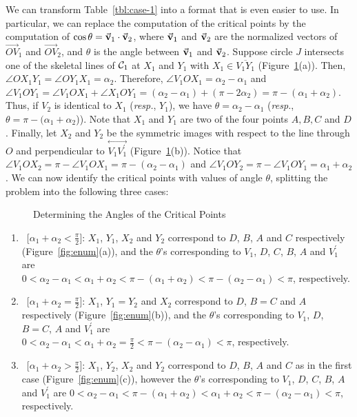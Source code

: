      We can transform Table~\ref{tbl:case-1} into a format that is even easier
to use.  In particular, we can replace the computation of the critical points
by the computation of $\cos\theta=\vec{\bf v}_1\cdot\vec{\bf v}_2$, where
$\vec{\bf v}_1$ and $\vec{\bf v}_2$ are the normalized vectors of
$\stackrel{\longrightarrow}{OV}_1$ and $\stackrel{\longrightarrow}{OV}_2$, and
$\theta$ is the angle between $\vec{\bf v}_1$ and $\vec{\bf v}_2$.
Suppose circle $J$ intersects one of the skeletal lines of
${\cal C}_1$ at $X_1$ and $Y_1$ with $X_1 \in \overline{V_1 Y_1}$
(Figure~\ref{fig:transform}(a)).
Then, $\angle OX_1Y_1=\angle OY_1X_1=\alpha_2$.  Therefore,
$\angle V_1OX_1=\alpha_2-\alpha_1$ and
$\angle V_1OY_1=\angle V_1OX_1+\angle X_1OY_1=
(\alpha_2-\alpha_1)+(\pi-2\alpha_2)=\pi-(\alpha_1+\alpha_2)$.
Thus, if $V_2$ is identical to
$X_1$ ({\em resp.}, $Y_1$), we have $\theta=\alpha_2-\alpha_1$
({\em resp.}, $\theta=\pi-(\alpha_1+\alpha_2$)).
Note that $X_1$ and $Y_1$ are two of the four points $A,B,C$ and $D$.
Finally, let $X_2$ and $Y_2$ be the symmetric images with respect
to the line through
$O$ and perpendicular to $\stackrel{\longleftrightarrow}{V_1V_1^\prime}$
(Figure~\ref{fig:transform}(b)).
Notice that
$\angle V_1OX_2=\pi-\angle V_1OX_1=\pi-(\alpha_2-\alpha_1)$ and
$\angle V_1OY_2=\pi-\angle V_1OY_1=\alpha_1+\alpha_2$.
We can now identify the critical points with values of angle $\theta$,
splitting the problem into the following three cases:
\begin{figure}
\vspace{4cm}
\caption{Determining the Angles of the Critical Points}
\label{fig:transform}
\end{figure}
\begin{enumerate}
     \item \ [$\alpha_1+\alpha_2<\frac{\pi}{2}$]:
          $X_1$, $Y_1$, $X_2$ and $Y_2$ correspond to $D$, $B$, $A$ and $C$
          respectively (Figure~\ref{fig:enum}(a)), and the
          $\theta$'s corresponding to $V_1$, $D$, $C$, $B$, $A$ and
       $V_1^\prime$ are \\$0 < \alpha_2-\alpha_1 < \alpha_1+\alpha_2
          < \pi-(\alpha_1+\alpha_2) < \pi-(\alpha_2-\alpha_1) < \pi$,
       respectively.

     \item \ [$\alpha_1+\alpha_2=\frac{\pi}{2}$]:
          $X_1$, $Y_1=Y_2$ and $X_2$ correspond to $D$, $B=C$ and $A$
          respectively (Figure~\ref{fig:enum}(b)), and the
          $\theta$'s corresponding to $V_1$, $D$, $B=C$, $A$ and $V_1^\prime$
          are \\$0 < \alpha_2-\alpha_1 < \alpha_1+\alpha_2=\frac{\pi}{2}
          < \pi-(\alpha_2-\alpha_1) < \pi$, respectively.

     \item \ [$\alpha_1+\alpha_2>\frac{\pi}{2}$]:
          $X_1$, $Y_2$, $X_2$ and $Y_2$ correspond to $D$, $B$, $A$ and $C$
          as in the first case (Figure~\ref{fig:enum}(c)), however
          the $\theta$'s corresponding to $V_1$, $D$, $C$, $B$, $A$ and
          $V_1^\prime$ are $0 < \alpha_2-\alpha_1 < \pi-(\alpha_1+\alpha_2)
          < \alpha_1+\alpha_2 < \pi-(\alpha_2-\alpha_1) < \pi$, respectively.
\end{enumerate}

